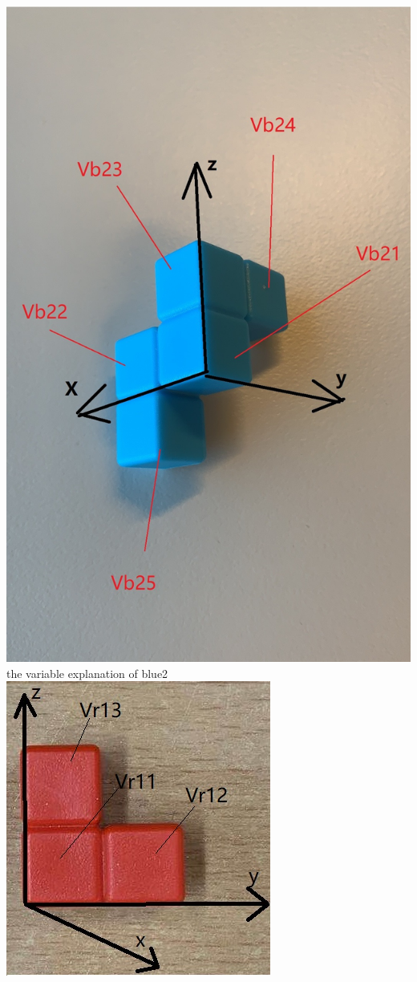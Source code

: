 \begin{center}
\includegraphics[scale=0.5]{game2blue2.jpg}\\
the variable explanation of blue2
\includegraphics{3Dred1.jpg}\\

\end{center}
